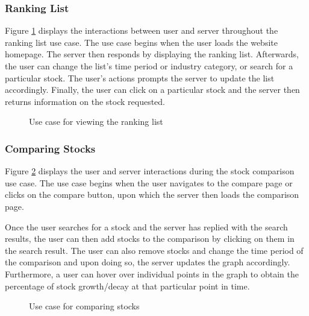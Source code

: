 \documentclass[11pt]{article}
\numberwithin{figure}{section}
\begin{document}
        \subsubsection{Ranking List}
            Figure \ref{fig:rankUseCase} displays the interactions between user and server throughout the ranking list use case. The use case begins when the user loads the website homepage. The server then responds by displaying the ranking list. Afterwards, the user can change the list’s time period or industry category, or search for a particular stock. The user's actions prompts the server to update the list accordingly. Finally, the user can click on a particular stock and the server then returns information on the stock requested.
        
            \begin{figure}[htp]
                \centering
                \caption{Use case for viewing the ranking list}
                \label{fig:rankUseCase}
            \end{figure}
    
        \subsubsection{Comparing Stocks}
            Figure \ref{fig:compareUseCase} displays the user and server interactions during the stock comparison use case. The use case begins when the user navigates to the compare page or clicks on the compare button, upon which the server then loads the comparison page.
        
            \bigskip
            \noindent
            Once the user searches for a stock and the server has replied with the search results, the user can then add stocks to the comparison by clicking on them in the search result. The user can also remove stocks and change the time period of the comparison and upon doing so, the server updates the graph accordingly. Furthermore, a user can hover over individual points in the graph to obtain the percentage of stock growth/decay at that particular point in time.
        
            
            \begin{figure}[htp]
                \centering
                \caption{Use case for comparing stocks}
                \label{fig:compareUseCase}
            \end{figure}
            \clearpage
\end{document}
